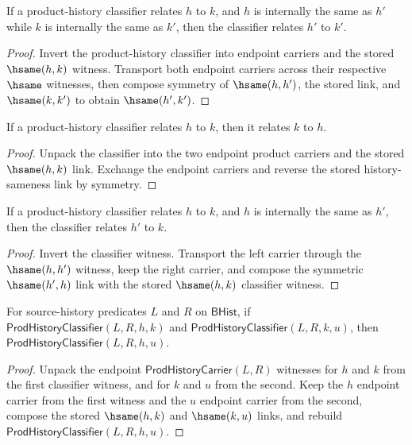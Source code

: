 \begin{theorem}
\label{thm:prod-history-classifier-hsame-transport}
If a product-history classifier relates $h$ to $k$, and $h$ is internally the same as $h'$ while $k$ is internally the same as $k'$, then the classifier relates $h'$ to $k'$.
\end{theorem}
\begin{proof}
Invert the product-history classifier into endpoint carriers and the stored $\hsame(h,k)$ witness. Transport both endpoint carriers across their respective $\hsame$ witnesses, then compose symmetry of $\hsame(h,h')$, the stored link, and $\hsame(k,k')$ to obtain $\hsame(h',k')$.
\end{proof}

\begin{theorem}
\label{thm:prod-history-classifier-symmetry}
If a product-history classifier relates \(h\) to \(k\), then it relates
\(k\) to \(h\).
\end{theorem}
\begin{proof}
Unpack the classifier into the two endpoint product carriers and the stored
\(\hsame(h,k)\) link. Exchange the endpoint carriers and reverse the stored
history-sameness link by symmetry.
\end{proof}

\begin{theorem}
\label{thm:prod-history-classifier-left-hsame-transport}
If a product-history classifier relates $h$ to $k$, and $h$ is internally the
same as $h'$, then the classifier relates $h'$ to $k$.
\end{theorem}
\begin{proof}
Invert the classifier witness. Transport the left carrier through the
$\hsame(h,h')$ witness, keep the right carrier, and compose the symmetric
$\hsame(h',h)$ link with the stored $\hsame(h,k)$ classifier witness.
\end{proof}

\begin{theorem}
\label{thm:prod-history-classifier-transitivity}
For source-history predicates $L$ and $R$ on $\mathsf{BHist}$, if $\mathsf{ProdHistoryClassifier}(L,R,h,k)$ and $\mathsf{ProdHistoryClassifier}(L,R,k,u)$, then $\mathsf{ProdHistoryClassifier}(L,R,h,u)$.
\end{theorem}
\begin{proof}
Unpack the endpoint $\mathsf{ProdHistoryCarrier}(L,R)$ witnesses for $h$ and $k$ from the first classifier witness, and for $k$ and $u$ from the second. Keep the $h$ endpoint carrier from the first witness and the $u$ endpoint carrier from the second, compose the stored $\hsame(h,k)$ and $\hsame(k,u)$ links, and rebuild $\mathsf{ProdHistoryClassifier}(L,R,h,u)$.
\end{proof}

